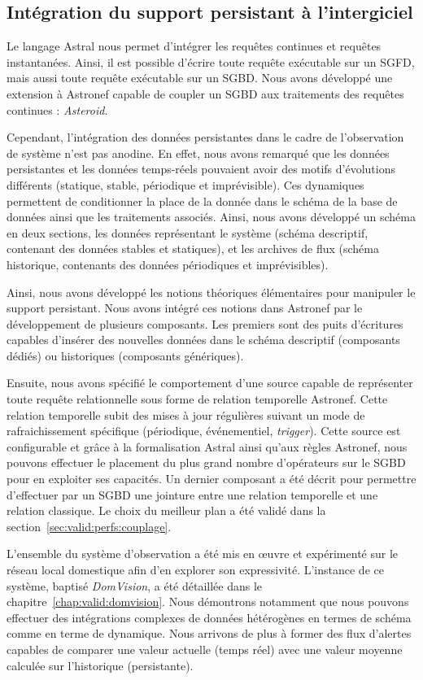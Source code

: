 \subsection{Intégration du support persistant à l'intergiciel}
Le langage Astral nous permet d'intégrer les requêtes continues et requêtes instantanées. Ainsi, il est possible d'écrire toute requête exécutable sur un SGFD, mais aussi toute requête exécutable sur un SGBD. Nous avons développé une extension à Astronef capable de coupler un SGBD aux traitements des requêtes continues : \textit{Asteroid}.

Cependant, l'intégration des données persistantes dans le cadre de l'observation de système n'est pas anodine. En effet, nous avons remarqué que les données persistantes et les données temps-réels pouvaient avoir des motifs d'évolutions différents (statique, stable, périodique et imprévisible). Ces dynamiques permettent de conditionner la place de la donnée dans le schéma de la base de données ainsi que les traitements associés. Ainsi, nous avons développé un schéma en deux sections, les données représentant le système (schéma descriptif, contenant des données stables et statiques), et les archives de flux (schéma historique, contenants des données périodiques et imprévisibles).

Ainsi, nous avons développé les notions théoriques élémentaires pour manipuler le support persistant. Nous avons intégré ces notions dans Astronef par le développement de plusieurs composants. Les premiers sont des puits d'écritures capables d'insérer des nouvelles données dans le schéma descriptif (composants dédiés) ou historiques (composants génériques).

Ensuite, nous avons spécifié le comportement d'une source capable de représenter toute requête relationnelle sous forme de relation temporelle Astronef. Cette relation temporelle subit des mises à jour régulières suivant un mode de rafraichissement spécifique (périodique, événementiel, \textit{trigger}). Cette source est configurable et grâce à la formalisation Astral ainsi qu'aux règles Astronef, nous pouvons effectuer le placement du plus grand nombre d'opérateurs sur le SGBD pour en exploiter ses capacités. Un dernier composant a été décrit pour permettre d'effectuer par un SGBD une jointure entre une relation temporelle et une relation classique. Le choix du meilleur plan a été validé dans la section~\ref{sec:valid:perfs:couplage}.

L'ensemble du système d'observation a été mis en œuvre et expérimenté sur le réseau local domestique afin d'en explorer son expressivité. L'instance de ce système, baptisé \textit{DomVision}, a été détaillée dans le chapitre~\ref{chap:valid:domvision}. Nous démontrons notamment que nous pouvons effectuer des intégrations complexes de données hétérogènes en termes de schéma comme en terme de dynamique. Nous arrivons de plus à former des flux d'alertes capables de comparer une valeur actuelle (temps réel) avec une valeur moyenne calculée sur l'historique (persistante).